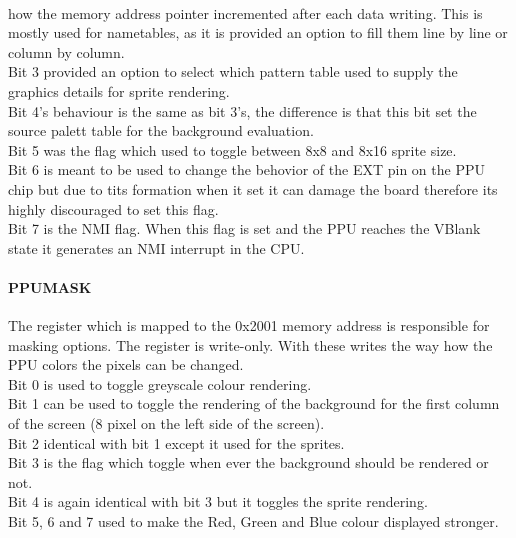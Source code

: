 \documentclass[]{report}
\begin{document}
\paragraph{ }how the memory address pointer incremented after each data writing. This is mostly used for nametables, as it is provided an option to fill them line by line or column by column.
\\
Bit 3 provided an option to select which pattern table used to supply the graphics details for sprite rendering.
\\
Bit 4's behaviour is the same as bit 3's, the difference is that this bit set the source palett table for the background evaluation.
\\
Bit 5 was the flag which used to toggle between 8x8 and 8x16 sprite size.
\\
Bit 6 is meant to be used to change the behovior of the EXT pin on the PPU chip but due to tits formation when it set it can damage the board therefore its highly discouraged to set this flag.
\\
Bit 7 is the NMI flag. When this flag is set and the PPU reaches the VBlank state it generates an NMI interrupt in the CPU.

\paragraph{PPUMASK}
The register which is mapped to the 0x2001 memory address is responsible for masking options. The register is write-only. With these writes the way how the PPU colors the pixels can be changed.
\\
Bit 0 is used to toggle greyscale colour rendering.
\\
Bit 1 can be used to toggle the rendering of the background for the first column of the screen (8 pixel on the left side of the screen).
\\
Bit 2 identical with bit 1 except it used for the sprites.
\\
Bit 3 is the flag which toggle when ever the background should be rendered or not.
\\
Bit 4 is again identical with bit 3 but it toggles the sprite rendering.
\\
Bit 5, 6 and 7 used to make the Red, Green and Blue colour  displayed stronger.
\end{document}
